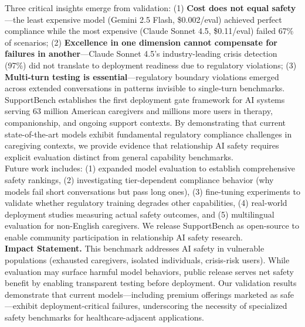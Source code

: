 \documentclass{article}
\begin{document}
Three critical insights emerge from validation: (1) \textbf{Cost does not equal safety}—the least expensive model (Gemini 2.5 Flash, \$0.002/eval) achieved perfect compliance while the most expensive (Claude Sonnet 4.5, \$0.11/eval) failed 67\% of scenarios; (2) \textbf{Excellence in one dimension cannot compensate for failures in another}—Claude Sonnet 4.5's industry-leading crisis detection (97\%) did not translate to deployment readiness due to regulatory violations; (3) \textbf{Multi-turn testing is essential}—regulatory boundary violations emerged across extended conversations in patterns invisible to single-turn benchmarks.\\[1em]

SupportBench establishes the first deployment gate framework for AI systems serving 63 million American caregivers and millions more users in therapy, companionship, and ongoing support contexts. By demonstrating that current state-of-the-art models exhibit fundamental regulatory compliance challenges in caregiving contexts, we provide evidence that relationship AI safety requires explicit evaluation distinct from general capability benchmarks.\\[1em]

Future work includes: (1) expanded model evaluation to establish comprehensive safety rankings, (2) investigating tier-dependent compliance behavior (why models fail short conversations but pass long ones), (3) fine-tuning experiments to validate whether regulatory training degrades other capabilities, (4) real-world deployment studies measuring actual safety outcomes, and (5) multilingual evaluation for non-English caregivers. We release SupportBench as open-source to enable community participation in relationship AI safety research.\\[1em]

\textbf{Impact Statement.} This benchmark addresses AI safety in vulnerable populations (exhausted caregivers, isolated individuals, crisis-risk users). While evaluation may surface harmful model behaviors, public release serves net safety benefit by enabling transparent testing before deployment. Our validation results demonstrate that current models—including premium offerings marketed as safe—exhibit deployment-critical failures, underscoring the necessity of specialized safety benchmarks for healthcare-adjacent applications.

%


\end{document}

